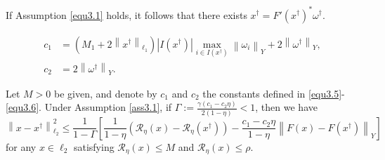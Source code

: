 \documentclass[10pt,a4paper]{amsart}
\begin{document}
\begin{lemma}\label{lem3.3}
    If Assumption \eqref{equ3.1} holds, it follows that there exists $x^{\dagger}= F'\left(x^{\dagger}\right)^{*}\omega^{\dagger}$. 
\end{lemma}

\begin{align}
    c_{1} &= \left(M_{1}+2\left\|x^{\dagger}\right\|_{\ell_{1}}\right) \left|I\left(x^{\dagger}\right)\right|\max_{i\in I\left(x^{\dagger}\right)} \left\|\omega_{i}\right\|_{Y}+2\left\|\omega^{\dagger}\right\|_{Y},  \label{equ3.5} \\
    c_{2} &= 2\left\|\omega^{\dagger}\right\|_{Y}.  \label{equ3.6}
\end{align}

\begin{lemma}\label{lem3.4}
    Let $M>0$ be given, and denote by $c_{1}$ and $c_{2}$ the constants defined in \eqref{equ3.5}-\eqref{equ3.6}. Under Assumption \ref{ass3.1}, if $\Gamma:=\frac{\gamma \left(c_{1}-c_{2}\eta\right)}{2\left(1-\eta\right)}<1$, then we have
    \begin{equation*}
        \left\|x-x^{\dagger}\right\|_{\ell_{2}}^{2}\leq \frac{1}{1-\Gamma} \left[\frac{1}{1-\eta}\left(\mathcal{R}_{\eta}\left(x\right)- \mathcal{R}_{\eta}\left(x^{\dagger}\right)\right)-\frac{c_{1}-c_{2}\eta} {1-\eta}\left\|F\left(x\right)- F\left(x^{\dagger}\right)\right\|_{Y}\right]
    \end{equation*}
    for any $x\in\ell_{2}$ satisfying $\mathcal{R}_{\eta}\left(x\right)\leq M$ and $\mathcal{R}_{\eta}\left(x\right)\leq \rho$.
\end{lemma}
\end{document}
